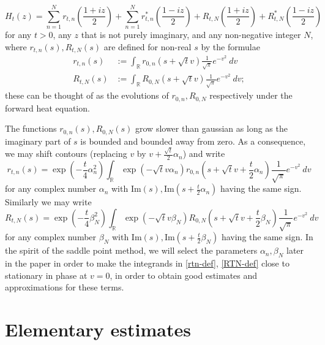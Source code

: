 \documentclass[a4paper,11pt,twoside]{amsart}
\newcommand\R{\mathbb{R}}
\begin{document}
\begin{equation}\label{htz-expand}
 H_t(z) = \sum_{n=1}^N r_{t,n}\left(\frac{1+iz}{2}\right) + \sum_{n=1}^N r_{t,n}^*\left(\frac{1-iz}{2}\right) + R_{t,N}\left(\frac{1+iz}{2}\right) + R_{t,N}^*\left(\frac{1-iz}{2}\right)
\end{equation}
for any $t>0$, any $z$ that is not purely imaginary, and any non-negative integer $N$, where $r_{t,n}(s), R_{t,N}(s)$ are defined for non-real $s$ by the formulae
\begin{align*}
 r_{t,n}(s) &:= \int_\R r_{0,n}\left( s + \sqrt{t} v \right) \frac{1}{\sqrt{\pi}} e^{-v^2}\ dv\\
 R_{t,N}(s) &:= \int_\R R_{0,N}\left( s + \sqrt{t} v \right) \frac{1}{\sqrt{\pi}} e^{-v^2}\ dv;
\end{align*}
these can be thought of as the evolutions of $r_{0,n}, R_{0,N}$ respectively under the forward heat equation.

The functions $r_{0,n}(s), R_{0,N}(s)$ grow slower than gaussian as long as the imaginary part of $s$ is bounded and bounded away from zero.  As a consequence, we may shift contours (replacing $v$ by $v + \frac{\sqrt{t}}{2} \alpha_n$) and write
\begin{equation}\label{rtn-def}
 r_{t,n}(s) = \exp\left( - \frac{t}{4} \alpha_n^2\right) \int_\R \exp\left( - \sqrt{t} v \alpha_n\right) r_{0,n}\left( s + \sqrt{t} v + \frac{t}{2} \alpha_n\right) \frac{1}{\sqrt{\pi}} e^{-v^2}\ dv
\end{equation}
for any complex number $\alpha_n$ with $\mathrm{Im}(s), \mathrm{Im}(s + \frac{t}{2} \alpha_n)$ having the same sign.  Similarly we may write
\begin{equation}\label{RTN-def}
 R_{t,N}(s) = \exp\left( - \frac{t}{4} \beta_N^2\right) \int_\R \exp\left( - \sqrt{t} v \beta_N\right) R_{0,N}\left( s + \sqrt{t} v + \frac{t}{2} \beta_N\right) \frac{1}{\sqrt{\pi}} e^{-v^2}\ dv
\end{equation}
for any complex number $\beta_N$ with $\mathrm{Im}(s), \mathrm{Im}(s + \frac{t}{2} \beta_N)$ having the same sign.  In the spirit of the saddle point method, we will select the parameters $\alpha_n, \beta_N$ later in the paper in order to make the integrands in \eqref{rtn-def}, \eqref{RTN-def} close to stationary in phase at $v=0$, in order to obtain good estimates and approximations for these terms.

\section{Elementary estimates}
\end{document}
